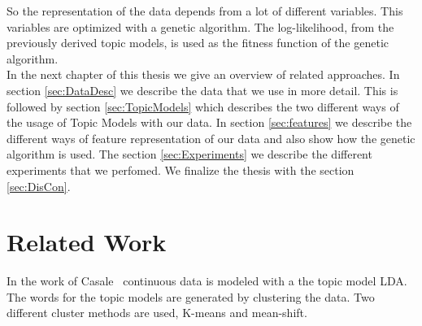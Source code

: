 \documentclass[11pt,a4paper]{article}
\begin{document}
So the representation of the data depends from a lot of different variables. This variables are optimized with a genetic algorithm. The log-likelihood, from the previously derived topic models, is used as the fitness function of the genetic algorithm.\\

In the next chapter of this thesis we give an overview of related approaches. In section \ref{sec:DataDesc} we describe the data that we use in more detail. This is followed by section \ref{sec:TopicModels} which describes the two different ways of the usage of Topic Models with our data. In section \ref{sec:features} we describe the different ways of feature representation of our data and also show how the genetic algorithm is used. The section \ref{sec:Experiments} we describe the different experiments that we perfomed. We finalize the thesis with the section \ref{sec:DisCon}.


% 
% 
% 
\pagebreak

\section{Related Work}
In the work of Casale~\cite{Casale:2009} continuous data is modeled with a the topic model LDA. The words for the topic models are generated by clustering the data. Two different cluster methods are used, K-means and mean-shift.

\pagebreak


\end{document}
